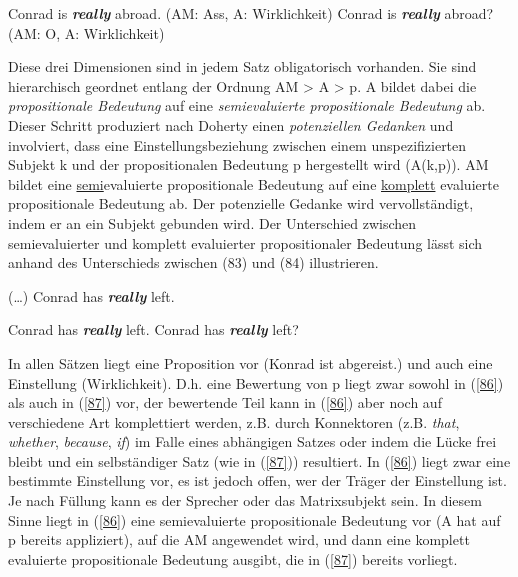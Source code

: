 \begin{exe}
	\ex\label{85} 
		\begin{xlist}	
			\ex\label{85a} Conrad is \textbf{\textit{really}} abroad. (AM: Ass, A: Wirklichkeit)
			\ex\label{85b} Conrad is \textbf{\textit{really}} abroad? (AM: O, A: Wirklichkeit)
			\hfill\hbox {\citet[14]{Doherty1987}}
		\end{xlist}
\end{exe}				           
Diese drei Dimensionen sind in jedem Satz obligatorisch vorhanden. Sie sind hie\-rarchisch geordnet entlang der Ordnung AM > A > p. A bildet dabei die \textit{propositionale Bedeutung}  auf eine \textit{semievaluier\-te propositionale Bedeutung}  ab. Dieser Schritt produziert nach Doherty einen \textit{potenziellen Gedanken} und involviert, dass eine Einstellungsbeziehung zwischen einem unspezifizierten Subjekt k und der propositionalen Bedeutung p hergestellt wird (A(k,p)). AM bildet eine \underline{semi}evalu\-ierte propositionale Bedeutung auf eine \underline{komplett} evaluierte propositionale Bedeutung ab. Der potenzielle Gedanke wird vervollständigt, indem er an ein Subjekt gebunden wird. Der Unterschied zwischen semievaluierter und komplett evaluierter propositionaler Bedeutung lässt sich anhand des Unterschieds zwischen (83) und (84) illustrieren.

\begin{exe}
	\ex\label{86} 
		(\ldots) Conrad has \textbf{\textit{really}} left.
\end{exe}
\vspace{-0.65cm}
\begin{exe}
	\ex\label{87} 
		\begin{xlist}	
			\ex\label{87a} Conrad has \textbf{\textit{really}} left.
			\ex\label{87b} Conrad has \textbf{\textit{really}} left?
		\end{xlist}
\end{exe}
In allen Sätzen liegt eine Proposition vor (Konrad ist abgereist.) und auch eine Einstellung (Wirklichkeit). D.h. eine Bewertung von p liegt zwar sowohl in (\ref{86}) als auch in (\ref{87}) vor, der bewertende Teil kann in (\ref{86}) aber noch auf verschiedene Art komplettiert werden, z.B. durch Konnektoren (z.B.\textit{ that}, \textit{whether}, \textit{because}, \textit{if}) im Falle eines abhängigen Satzes oder indem die Lücke frei bleibt und ein selbständiger Satz (wie in (\ref{87})) resultiert. In (\ref{86}) liegt zwar eine bestimmte Einstellung vor, es ist jedoch offen, wer der Träger der Einstellung ist. Je nach Füllung kann es der Sprecher oder das Matrixsubjekt sein. In diesem Sinne liegt in (\ref{86}) eine semievaluierte propositionale Bedeutung vor (A hat auf p bereits appliziert), auf die AM angewendet wird, und dann eine komplett evaluierte propositionale Bedeutung ausgibt, die in (\ref{87}) bereits vorliegt.

